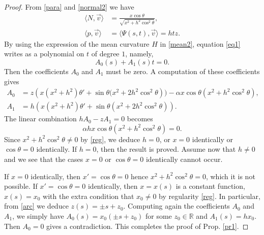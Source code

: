 \documentclass[a4paper,12pt]{amsart}
\theoremstyle{definition}
\def\r{\mathbb R}
\begin{document}
\begin{proof} From \eqref{para} and \eqref{normal2} we have 
\begin{equation*}
\begin{split}
\langle N,\vec{v}\rangle&=\frac{x\cos\theta}{\sqrt{x^2+h^2\cos^2\theta}},\\
\langle p,\vec{v}\rangle&=\langle \Psi(s,t),\vec{v}\rangle=htz.
\end{split}
\end{equation*}
By using the expression of the mean curvature $H$ in \eqref{mean2}, equation \eqref{eq1} writes as a polynomial on $t$ of degree $1$, namely, 
$$A_0(s)+A_1(s) t=0.$$
Then the coefficients $A_0$ and $A_1$ must be zero. A computation of these coefficients gives
\begin{equation*}
\begin{split}
A_0&=z \left(x (x^2+h^2) \theta '+\sin\theta (x^2+2 h^2 \cos ^2\theta\right))- \alpha  x \cos \theta \left(x^2+h^2 \cos ^2\theta\right),\\
A_1&=h \left(x (x^2+h^2) \theta '+\sin\theta (x^2+2 h^2 \cos ^2\theta )\right).
\end{split}
\end{equation*}
The linear combination $h A_0-z A_1=0$ becomes
$$\alpha h x\cos\theta(x^2+h^2\cos^2\theta)=0.$$
Since $x^2+h^2\cos^2\theta\not=0$ by \eqref{reg}, we deduce $h=0$, or $x=0$ identically or $\cos\theta=0$ identically. If $h=0$, then the result is proved. Assume now that $h\not=0$ and we see that the cases $x=0$ or $\cos\theta=0$ identically cannot occur. 

If $x=0$ identically, then $x'=\cos\theta=0$ hence $x^2+h^2\cos^2\theta=0$, which it is not possible. If $x'=\cos\theta=0$ identically, then $x=x(s)$ is a constant function, $x(s)=x_0$ with the extra condition that $x_0\not=0$ by  regularity \eqref{reg}. In particular, from \eqref{arc} we deduce $z(s)=\pm s+z_0$. Computing again  the coefficients  $A_0$ and $A_1$, we simply have 
$A_0(s)=x_0(\pm s+z_0)$ for some $z_0\in\r$ and $A_1(s)=hx_0$. Then $A_0=0$ gives a contradiction. This completes the proof of Prop. \ref{pr1}.
\end{proof}
\end{document}
